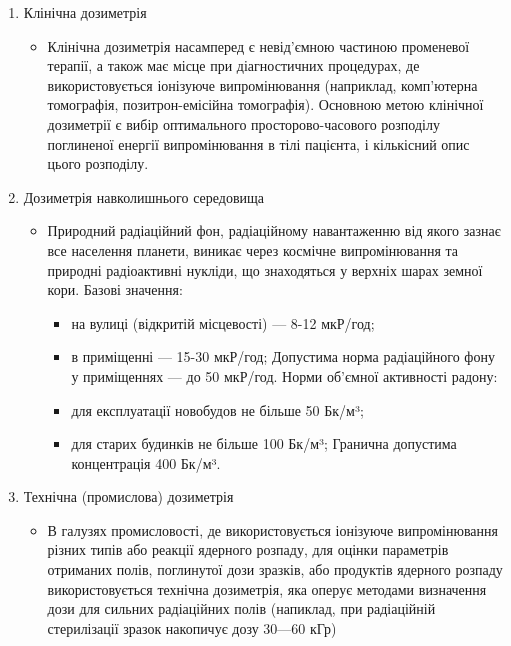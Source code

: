 \documentclass{article}
\begin{document}
\begin{enumerate}
	\item Клінічна дозиметрія
	\begin{itemize}
        \item Клінічна дозиметрія насамперед є невід'ємною частиною променевої терапії, а також має місце при діагностичних процедурах, де використовується іонізуюче випромінювання (наприклад, комп'ютерна томографія, позитрон-емісійна томографія). Основною метою клінічної дозиметрії є вибір оптимального просторово-часового розподілу поглиненої енергії випромінювання в тілі пацієнта, і кількісний опис цього розподілу.
    \end{itemize}
    \item Дозиметрія навколишнього середовища
	\begin{itemize}
        \item Природний радіаційний фон,  радіаційному навантаженню від якого зазнає все населення планети, виникає через космічне випромінювання та природні радіоактивні нукліди, що знаходяться у верхніх шарах земної кори. \newline Базові значення:
        \begin{itemize}
            \item на вулиці (відкритій місцевості) — 8-12 мкР/год;
            \item в приміщенні — 15-30 мкР/год; 
            \newline Допустима норма радіаційного фону у приміщеннях — до 50 мкР/год. \newline Норми об'ємної активності радону:
            \item для експлуатації новобудов не більше 50 Бк/м³;
            \item для старих будинків не більше 100 Бк/м³; 
            \newline Гранична допустима концентрація 400 Бк/м³.
        \end{itemize}
    \end{itemize}
    \item Технічна (промислова) дозиметрія
    \begin{itemize}
    \item В галузях промисловості, де використовується іонізуюче випромінювання різних типів або реакції ядерного розпаду, для оцінки параметрів отриманих полів, поглинутої дози зразків, або продуктів ядерного розпаду використовується технічна дозиметрія, яка оперує методами визначення дози для сильних радіаційних полів (напиклад, при радіаційній стерилізації зразок накопичує дозу 30—60 кГр)

\end{itemize}
\end{enumerate}
\end{document}
